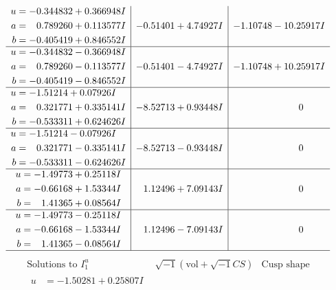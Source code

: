 \documentclass[1p]{elsarticle_modified}
\theoremstyle{definition}
\newcommand{\I}{\sqrt{-1}}
\begin{document}
$$\begin{array}{c|c|c}
\begin{aligned}
u &= -0.344832 + 0.366948 I \\
a &= \phantom{-}0.789260 + 0.113577 I \\
b &= -0.405419 + 0.846552 I\end{aligned}
 & -0.51401 + 4.74927 I & -1.10748 - 10.25917 I \\ \hline\begin{aligned}
u &= -0.344832 - 0.366948 I \\
a &= \phantom{-}0.789260 - 0.113577 I \\
b &= -0.405419 - 0.846552 I\end{aligned}
 & -0.51401 - 4.74927 I & -1.10748 + 10.25917 I \\ \hline\begin{aligned}
u &= -1.51214 + 0.07926 I \\
a &= \phantom{-}0.321771 + 0.335141 I \\
b &= -0.533311 + 0.624626 I\end{aligned}
 & -8.52713 + 0.93448 I & \phantom{-0.000000 } 0 \\ \hline\begin{aligned}
u &= -1.51214 - 0.07926 I \\
a &= \phantom{-}0.321771 - 0.335141 I \\
b &= -0.533311 - 0.624626 I\end{aligned}
 & -8.52713 - 0.93448 I & \phantom{-0.000000 } 0 \\ \hline\begin{aligned}
u &= -1.49773 + 0.25118 I \\
a &= -0.66168 + 1.53344 I \\
b &= \phantom{-}1.41365 + 0.08564 I\end{aligned}
 & \phantom{-}1.12496 + 7.09143 I & \phantom{-0.000000 } 0 \\ \hline\begin{aligned}
u &= -1.49773 - 0.25118 I \\
a &= -0.66168 - 1.53344 I \\
b &= \phantom{-}1.41365 - 0.08564 I\end{aligned}
 & \phantom{-}1.12496 - 7.09143 I & \phantom{-0.000000 } 0\\
 \hline 
 \end{array}$$\newpage$$\begin{array}{c|c|c}  
\text{Solutions to }I^u_{1}& \I (\text{vol} + \sqrt{-1}CS) & \text{Cusp shape}\\
 \hline 
\begin{aligned}
u &= -1.50281 + 0.25807 I \\

\end{aligned}
\end{array}$$
\end{document}
